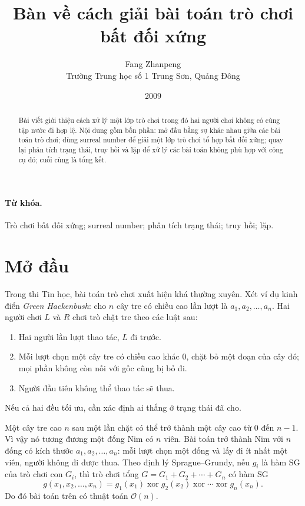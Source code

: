 \documentclass[11pt]{article}
\title{Bàn về cách giải bài toán trò chơi bất đối xứng}
\author{Fang Zhanpeng\\Trường Trung học số 1 Trung Sơn, Quảng Đông}
\date{2009}
\newcommand{\Oh}{\mathcal{O}}
\begin{document}
\maketitle


\begin{abstract}
Bài viết giới thiệu cách xử lý một lớp trò chơi trong đó hai người chơi không
có cùng tập nước đi hợp lệ. Nội dung gồm bốn phần: mở đầu bằng sự khác nhau
giữa các bài toán trò chơi; dùng surreal number để giải một lớp trò chơi tổ
hợp bất đối xứng; quay lại phân tích trạng thái, truy hồi và lặp để xử lý các
bài toán không phù hợp với công cụ đó; cuối cùng là tổng kết.
\end{abstract}

\paragraph{Từ khóa.}
Trò chơi bất đối xứng; surreal number; phân tích trạng thái; truy hồi; lặp.

\section{Mở đầu}

Trong thi Tin học, bài toán trò chơi xuất hiện khá thường xuyên. Xét ví dụ
kinh điển \emph{Green Hackenbush}: cho \(n\) cây tre có chiều cao lần lượt là
\(a_1,a_2,\ldots,a_n\). Hai người chơi \(L\) và \(R\) chơi trò chặt tre theo
các luật sau:
\begin{enumerate}
  \item Hai người lần lượt thao tác, \(L\) đi trước.
  \item Mỗi lượt chọn một cây tre có chiều cao khác \(0\), chặt bỏ một đoạn
  của cây đó; mọi phần không còn nối với gốc cũng bị bỏ đi.
  \item Người đầu tiên không thể thao tác sẽ thua.
\end{enumerate}
Nếu cả hai đều tối ưu, cần xác định ai thắng ở trạng thái đã cho.

Một cây tre cao \(n\) sau một lần chặt có thể trở thành một cây cao từ \(0\)
đến \(n-1\). Vì vậy nó tương đương một đống Nim có \(n\) viên. Bài toán trở
thành Nim với \(n\) đống có kích thước \(a_1,a_2,\ldots,a_n\): mỗi lượt chọn
một đống và lấy đi ít nhất một viên, người không đi được thua. Theo định lý
Sprague--Grundy, nếu \(g_i\) là hàm SG của trò chơi con \(G_i\), thì trò chơi
tổng \(G=G_1+G_2+\cdots+G_n\) có hàm SG
\[
  g(x_1,x_2,\ldots,x_n)
  =g_1(x_1)\operatorname{xor}g_2(x_2)\operatorname{xor}\cdots
   \operatorname{xor}g_n(x_n).
\]
Do đó bài toán trên có thuật toán \(\Oh(n)\).
\end{document}
